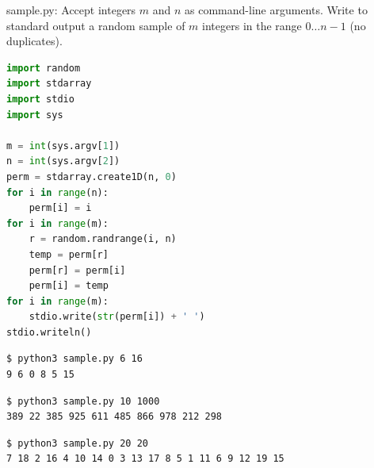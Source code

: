 \documentclass[8pt,a4paper,compress]{beamer}
\begin{document}
\begin{frame}[fragile]
\pause

\begin{framed}
\tiny sample.py: Accept integers $m$ and $n$ as command-line arguments. Write to standard output a random sample of $m$ integers in the range $0 \dots n-1$ (no duplicates).
\end{framed}

\begin{lstlisting}[language=Python,style=focusin]
import random
import stdarray
import stdio
import sys

m = int(sys.argv[1])
n = int(sys.argv[2])
perm = stdarray.create1D(n, 0)
for i in range(n):
    perm[i] = i
for i in range(m):
    r = random.randrange(i, n)
    temp = perm[r]
    perm[r] = perm[i]
    perm[i] = temp
for i in range(m):
    stdio.write(str(perm[i]) + ' ')
stdio.writeln()
\end{lstlisting}

\pause\bigskip

\begin{lstlisting}[language={},style=focusin]
$ python3 sample.py 6 16
9 6 0 8 5 15 
\end{lstlisting}

\pause\bigskip

\begin{lstlisting}[language={},style=focusin]
$ python3 sample.py 10 1000
389 22 385 925 611 485 866 978 212 298 
\end{lstlisting}

\pause\bigskip

\begin{lstlisting}[language={},style=focusin]
$ python3 sample.py 20 20
7 18 2 16 4 10 14 0 3 13 17 8 5 1 11 6 9 12 19 15 
\end{lstlisting}
\end{frame}
\end{document}
